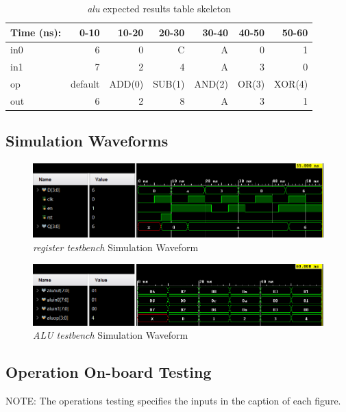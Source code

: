 \documentclass[11pt]{article}
\begin{document}
\begin{table}[ht]\centering
	\caption{\textit{alu} expected results table skeleton}
	\label{ALU:tbl:alu_ERT}\medskip
	\begin{tabular}{l|rrrrrr}
		Time (ns): & 0-10 & 10-20 & 20-30 & 30-40 & 40-50 & 50-60 \\
		\midrule
		in0 & 6  & 0 & C & A & 0 & 1 \\
		in1 & 7 & 2 & 4 & A & 3 & 0 \\
		op    & default & ADD(0) & SUB(1) & AND(2) & OR(3) & XOR(4) \\
		\midrule
		out & 6 & 2 & 8 & A & 3 & 1 \\
		\bottomrule
	\end{tabular}
\end{table}
\clearpage

\subsection*{Simulation Waveforms}
\begin{figure}[ht]\centering
	\includegraphics[width=1\textwidth]{register_test}
	\caption{\textit{register testbench} Simulation Waveform}
	\label{fig:sim_with_table}
\end{figure}

\begin{figure}[ht]\centering
	\includegraphics[width=1\textwidth]{alu_test}
	\caption{\textit{ALU testbench} Simulation Waveform}
	\label{fig:sim_with_table}
\end{figure}
\clearpage

\subsection*{Operation On-board Testing}

NOTE: The operations testing specifies the inputs in the caption of each figure.
\end{document}

